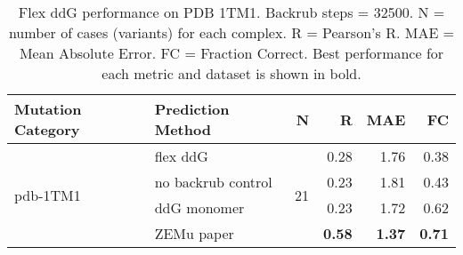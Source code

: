 \begin{table}
  \begin{tabular}{llrrrr}
\toprule
Mutation Category &   Prediction Method &   N &    R &  MAE &   FC \\
\midrule
 \multirow{ 4}{*}{pdb-1TM1} & flex ddG & \multirow{ 4}{*}{21} & 0.28 & 1.76 & 0.38  \\
 & no backrub control & & 0.23 & 1.81 & 0.43  \\
 & ddG monomer & & 0.23 & 1.72 & 0.62  \\
 & ZEMu paper & & \textbf{0.58} & \textbf{1.37} & \textbf{0.71}  \\
\bottomrule
\end{tabular}
  \caption[Flex ddG performance on PDB 1TM1]{
    Flex ddG performance on PDB 1TM1. Backrub steps = 32500. N = number of cases (variants) for each complex. R = Pearson's R. MAE = Mean Absolute Error. FC = Fraction Correct. Best performance for each metric and dataset is shown in bold.
  } \label{tab:table-pdb-1TM1}
\end{table}
